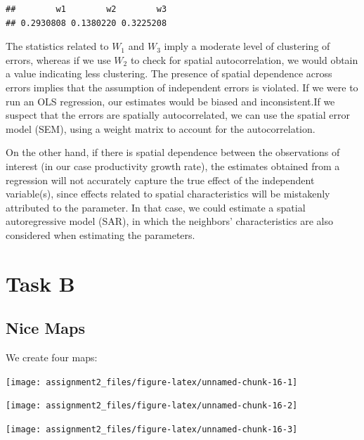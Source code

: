 \documentclass[
  a4paper,
]{article}
\begin{document}
\begin{verbatim}
##        w1        w2        w3 
## 0.2930808 0.1380220 0.3225208
\end{verbatim}

The statistics related to \(W_1\) and \(W_3\) imply a moderate level of
clustering of errors, whereas if we use \(W_2\) to check for spatial
autocorrelation, we would obtain a value indicating less clustering. The
presence of spatial dependence across errors implies that the assumption
of independent errors is violated. If we were to run an OLS regression,
our estimates would be biased and inconsistent.If we suspect that the
errors are spatially autocorrelated, we can use the spatial error model
(SEM), using a weight matrix to account for the autocorrelation.

On the other hand, if there is spatial dependence between the
observations of interest (in our case productivity growth rate), the
estimates obtained from a regression will not accurately capture the
true effect of the independent variable(s), since effects related to
spatial characteristics will be mistakenly attributed to the parameter.
In that case, we could estimate a spatial autoregressive model (SAR), in
which the neighbors' characteristics are also considered when estimating
the parameters.

\newpage

\section{Task B}\label{task-b}

\subsection{Nice Maps}\label{nice-maps}

We create four maps:

\begin{center}\texttt{[image: assignment2\_files/figure-latex/unnamed-chunk-16-1]} \end{center}

\begin{center}\texttt{[image: assignment2\_files/figure-latex/unnamed-chunk-16-2]} \end{center}

\begin{center}\texttt{[image: assignment2\_files/figure-latex/unnamed-chunk-16-3]} \end{center}
\end{document}
